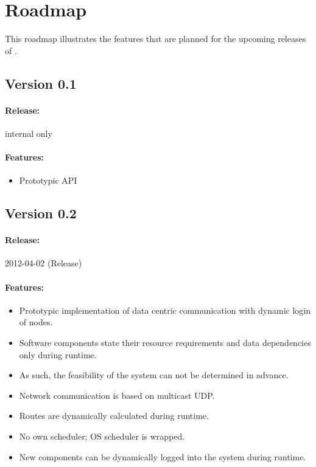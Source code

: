 %
% 
%
%
%

\section{Roadmap}
\label{appx:roadmap}

This roadmap illustrates the features that are planned for the upcoming releases of \xme.



\subsection{Version 0.1}

\paragraph{Release:} internal only

\paragraph{Features:}
\begin{itemize}
	\item Prototypic API
\end{itemize}



\subsection{Version 0.2}

\paragraph{Release:} 2012-04-02 (Release)

\paragraph{Features:}
\begin{itemize}
	\item Prototypic implementation of data centric communication with dynamic login of nodes.
	\item Software components state their resource requirements and data dependencies only during runtime.
	\item As such, the feasibility of the system can not be determined in advance.
	\item Network communication is based on multicast UDP.
	\item Routes are dynamically calculated during runtime.
	\item No own scheduler; OS scheduler is wrapped.
	\item New components can be dynamically logged into the system during runtime.
\end{itemize}

